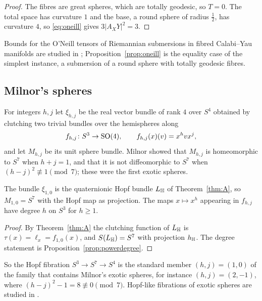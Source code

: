 \begin{proof}
The fibres are great spheres, which are totally geodesic, so $T=0$. The total space has curvature $1$ and the base, a round sphere of radius $\frac12$, has curvature $4$, so \eqref{eq:oneill} gives $3|A_XY|^2=3$.
\end{proof}

Bounds for the O'Neill tensors of Riemannian submersions in fibred Calabi--Yau manifolds are studied in \cite{GBN26}; Proposition~\ref{prop:oneill} is the equality case of the simplest instance, a submersion of a round sphere with totally geodesic fibres.

\subsection{Milnor's spheres}\label{sec:milnor}

For integers $h,j$ let $\xi_{h,j}$ be the real vector bundle of rank $4$ over $S^4$ obtained by clutching two trivial bundles over the hemispheres along
\[
f_{h,j}\colon S^3\to\mathrm{SO}(4),\qquad f_{h,j}(x)(v)=x^hvx^j,
\]
and let $M_{h,j}$ be its unit sphere bundle. Milnor \cite{Mil56} showed that $M_{h,j}$ is homeomorphic to $S^7$ when $h+j=1$, and that it is not diffeomorphic to $S^7$ when $(h-j)^2\not\equiv1\pmod 7$; these were the first exotic spheres.

\begin{proposition}\label{prop:milnorhopf}
The bundle $\xi_{1,0}$ is the quaternionic Hopf bundle $L_{\mathbb{H}}$ of Theorem~\ref{thm:A}, so $M_{1,0}=S^7$ with the Hopf map as projection. The maps $x\mapsto x^h$ appearing in $f_{h,j}$ have degree $h$ on $S^3$ for $h\ge1$.
\end{proposition}

\begin{proof}
By Theorem~\ref{thm:A} the clutching function of $L_{\mathbb{H}}$ is $\tau(x)=\ell_x=f_{1,0}(x)$, and $S(L_{\mathbb{H}})=S^7$ with projection $h_{\mathbb{H}}$. The degree statement is Proposition~\ref{prop:powerdegree}.
\end{proof}

So the Hopf fibration $S^3\to S^7\to S^4$ is the standard member $(h,j)=(1,0)$ of the family that contains Milnor's exotic spheres, for instance $(h,j)=(2,-1)$, where $(h-j)^2-1=8\not\equiv0\pmod7$. Hopf-like fibrations of exotic spheres are studied in \cite{Bha26b}.
